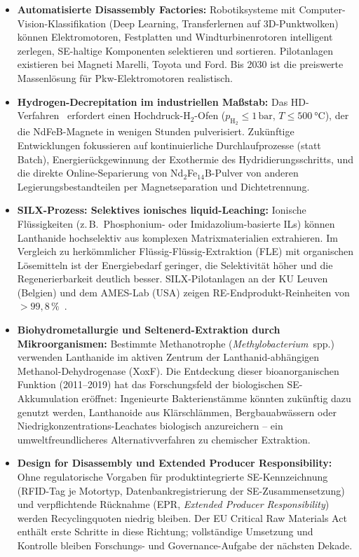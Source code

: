 ﻿\documentclass[12pt, a4paper]{report}
\theoremstyle{definition}
\theoremstyle{remark}
\begin{document}
\begin{itemize}
  \item \textbf{Automatisierte Disassembly Factories:}
    Robotiksysteme mit Computer-Vision-Klas\-sifikation (Deep Learning,
    Transferlernen auf 3D-Punktwolken) können Elektromotoren, Festplatten
    und Windturbinenrotoren intelligent zerlegen, SE-haltige Komponenten
    selektieren und sortieren. Pilotanlagen existieren bei
    Magneti Marelli, Toyota und Ford. Bis 2030 ist die preiswerte Massenlösung
    für Pkw-Elektromotoren realistisch.

  \item \textbf{Hydrogen-Decrepitation im industriellen Maßstab:}
    Das HD-Verfahren~\cite{zakotnik2009} erfordert einen Hochdruck-$\text{H}_2$-Ofen
    ($p_{\mathrm{H_2}} \leq 1\,\text{bar}$, $T \leq \SI{500}{\celsius}$), der die
    NdFeB-Magnete in wenigen Stunden pulverisiert. Zukünftige Entwicklungen
    fokussieren auf kontinuierliche Durchlaufprozesse (statt Batch),
    Energierückgewinnung der Exothermie des Hydridierungsschritts, und
    die direkte Online-Separierung von Nd$_2$Fe$_{14}$B-Pulver von anderen
    Legierungsbestandteilen per Magnetseparation und Dichtetrennung.

  \item \textbf{SILX-Prozess: Selektives ionisches liquid-Leaching:}
    Ionische Flüssigkeiten (z.\,B.\ Phosphonium- oder Imidazolium-basierte
    ILs) können Lan\-thanide hochselektiv aus komplexen Matrixmaterialien
    extrahieren. Im Vergleich zu herkömmlicher Flüssig-Flüssig-Extraktion
    (FLE) mit organischen Lösemitteln ist der Energiebedarf geringer, die
    Selektivität höher und die Regenerierbarkeit deutlich besser.
    SILX-Pilotanlagen an der KU Leuven (Belgien) und dem AMES-Lab (USA)
    zeigen RE-Endprodukt-Reinheiten von $>99{,}8\,\%$~\cite{binnemans2013}.

  \item \textbf{Biohydrometallurgie und Seltenerd-Extraktion durch Mikroorganismen:}
    Bestimmte Methanotrophe (\emph{Methylobacterium}~spp.) verwenden
    Lanthanide im aktiven Zentrum der Lanthanid-abhängigen
    Methanol-Dehydrogenase (XoxF). Die Entdeckung dieser bioanorganischen
    Funktion (2011--2019) hat das Forschungsfeld der biologischen
    SE-Akkumulation eröffnet: Ingenieurte Bakterienstämme könnten zukünftig
    dazu genutzt werden, Lanthanoide aus Klärschlämmen, Bergbauabwässern
    oder Niedrigkonzentrations-Leachates biologisch anzureichern --
    ein umweltfreundlicheres Alternativverfahren zu chemischer Extraktion.

  \item \textbf{Design for Disassembly und Extended Producer Responsibility:}
    Ohne regulatorische Vorgaben für produktintegrierte SE-Kennzeichnung
    (RFID-Tag je Motortyp, Datenbankregistrierung der SE-Zusammensetzung)
    und verpflichtende Rücknahme (EPR, \emph{Extended Producer Responsibility})
    werden Recyclingquoten niedrig bleiben. Der EU Critical Raw Materials
    Act~\cite{eu2023} enthält erste Schritte in diese Richtung; vollständige
    Umsetzung und Kontrolle bleiben Forschungs- und Governance-Aufgabe
    der nächsten Dekade.
\end{itemize}
\end{document}
